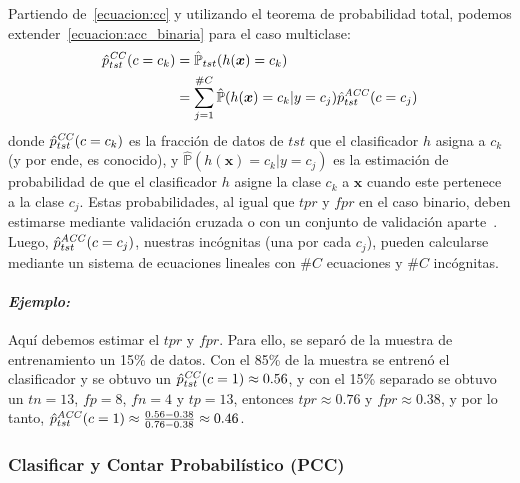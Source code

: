 Partiendo de~\ref{ecuacion:cc} y utilizando el teorema de probabilidad total,
podemos extender~\ref{ecuacion:acc_binaria} para el caso multiclase:
\begin{align}
\begin{split}
    \hat p^{\it{CC}}_{tst}(c=c_k) &= \mathbb{\hat P}_{tst}(h(\boldsymbol{x})=c_k) \\
    &= \sum \limits_{j=1}^{\#C}{\mathbb{\hat P}(h(\boldsymbol{x})=c_k|y=c_j) \hat p^{\it{ACC}}_{tst}(c=c_j)}\label{ecuacion:acc_multiclase}
\end{split}
\end{align}
donde $\hat p^{\it{CC}}_{tst}(c=c_k)$ es la fracción de datos de $tst$ que el
clasificador $h$ asigna a $c_k$ (y por ende, es conocido), y
$\mathbb{\hat{P}}(h(\boldsymbol{x})=c_k|y=c_j)$ es la estimación de probabilidad
de que el clasificador $h$ asigne la clase $c_k$ a $\boldsymbol{x}$ cuando este
pertenece a la clase $c_j$. Estas probabilidades, al igual que $tpr$ y $fpr$ en
el caso binario, deben estimarse mediante validación cruzada o con un conjunto
de validación aparte~\cite{barranquero2013study, forman2005counting,
forman2008quantifying}. Luego, $\hat p^{\it{ACC}}_{tst}(c=c_j)$, nuestras
incógnitas (una por cada $c_j$), pueden calcularse mediante un sistema de
ecuaciones lineales con $\#C$ ecuaciones y $\#C$ incógnitas.

\paragraph{\it Ejemplo:\/} Aquí debemos estimar el $tpr$ y $fpr$. Para ello, se
separó de la muestra de entrenamiento un 15\% de datos. Con el 85\% de la
muestra se entrenó el clasificador y se obtuvo un $\hat p^{\it{CC}}_{tst}(c=1)
\approx 0.56$, y con el 15\% separado se obtuvo un $tn=13$, $fp=8$, $fn=4$ y
$tp=13$, entonces $tpr \approx 0.76$ y $fpr \approx 0.38$, y por lo tanto, $\hat
p^{\it{ACC}}_{tst}(c=1) \approx \frac{0.56-0.38}{0.76-0.38} \approx 0.46$.

\subsubsection{Clasificar y Contar Probabilístico (PCC)}\label{puntual:pcc}

